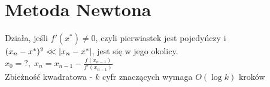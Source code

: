 \section{Metoda Newtona}
Działa, jeśli \( f'(x^*) \neq 0 \), czyli pierwiastek jest pojedyńczy i \( (x_n - x^*)^2 <\!\!< \left\lvert x_n - x^*\right\rvert \), jest się w jego okolicy. \\
\( x_0 = ?, \; x_n = x_{n-1} - \frac{f(x_{n-1})}{f'(x_{n-1})} \) \\
Zbieżność kwadratowa - \( k \) cyfr znaczących wymaga \( O(\log k) \) kroków